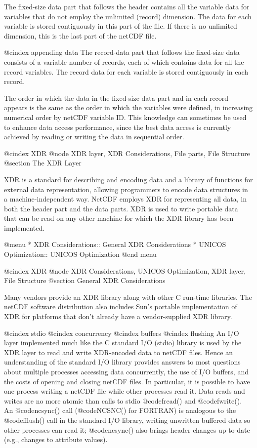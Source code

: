 {The fixed-size data part that follows the header contains all the
variable data for variables that do not employ the unlimited (record)
dimension.  The data for each variable is stored contiguously in this
part of the file.  If there is no unlimited dimension, this is the last
part of the netCDF file.

@cindex appending data
The record-data part that follows the fixed-size data consists of a
variable number of records, each of which contains data for all
the record variables.  The record data for each variable is stored
contiguously in each record.

The order in which the data in the fixed-size data part and in each
record appears is the same as the order in which the variables were
defined, in increasing numerical order by netCDF variable ID.  This
knowledge can sometimes be used to enhance data access performance,
since the best data access is currently achieved by reading or writing
the data in sequential order.

@cindex XDR
@node XDR layer, XDR Considerations, File parts, File Structure
@section The XDR Layer

XDR is a standard for describing and encoding data and a library of
functions for external data representation, allowing programmers to
encode data structures in a machine-independent way.  NetCDF employs XDR
for representing all data, in both the header part and the data parts.
XDR is used to write portable data that can be read on any other machine
for which the XDR library has been implemented.

@menu
* XDR Considerations::  General XDR Considerations
* UNICOS Optimization::   UNICOS Optimization
@end menu

@cindex XDR
@node XDR Considerations, UNICOS Optimization, XDR layer, File Structure
@section General XDR Considerations

Many vendors provide an XDR library along with other C run-time
libraries.  The netCDF software distribution also includes Sun's
portable implementation of XDR for platforms that don't already have a
vendor-supplied XDR library.

@cindex stdio
@cindex concurrency
@cindex buffers
@cindex flushing
An I/O layer implemented much like the C standard I/O (stdio) library is
used by the XDR layer to read and write XDR-encoded data to netCDF
files.  Hence an understanding of the standard I/O library provides
answers to most questions about multiple processes accessing data
concurrently, the use of I/O buffers, and the costs of opening and
closing netCDF files.  In particular, it is possible to have one process
writing a netCDF file while other processes read it.  Data reads and
writes are no more atomic than calls to stdio @code{fread()} and
@code{fwrite()}.  An @code{ncsync()} call (@code{NCSNC()} for FORTRAN)
is analogous to the @code{fflush()} call in the standard I/O library,
writing unwritten buffered data so other processes can read it;
@code{ncsync()} also brings header changes up-to-date (e.g., changes to
attribute values).

}
